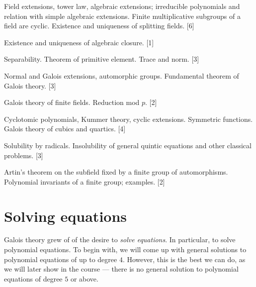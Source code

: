 \documentclass[a4paper]{article}
\begin{document}
\maketitle
{\small
\noindent Field extensions, tower law, algebraic extensions; irreducible polynomials and relation with simple algebraic extensions. Finite multiplicative subgroups of a field are cyclic. Existence and uniqueness of splitting fields.\hspace*{\fill} [6]

\vspace{5pt}
\noindent Existence and uniqueness of algebraic closure.\hspace*{\fill} [1]

\vspace{5pt}
\noindent Separability. Theorem of primitive element. Trace and norm.\hspace*{\fill} [3]

\vspace{5pt}
\noindent Normal and Galois extensions, automorphic groups. Fundamental theorem of Galois theory.\hspace*{\fill} [3]

\vspace{5pt}
\noindent Galois theory of finite fields. Reduction mod $p$.\hspace*{\fill} [2]

\vspace{5pt}
\noindent Cyclotomic polynomials, Kummer theory, cyclic extensions. Symmetric functions. Galois theory of cubics and quartics.\hspace*{\fill} [4]

\vspace{5pt}
\noindent Solubility by radicals. Insolubility of general quintic equations and other classical problems.\hspace*{\fill} [3]

\vspace{5pt}
\noindent Artin's theorem on the subfield fixed by a finite group of automorphisms. Polynomial invariants of a finite group; examples.\hspace*{\fill}  [2]}

\tableofcontents

\section{Solving equations}
Galois theory grew of of the desire to \emph{solve equations}. In particular, to solve polynomial equations. To begin with, we will come up with general solutions to polynomial equations of up to degree $4$. However, this is the best we can do, as we will later show in the course --- there is no general solution to polynomial equations of degree $5$ or above.
\end{document}
